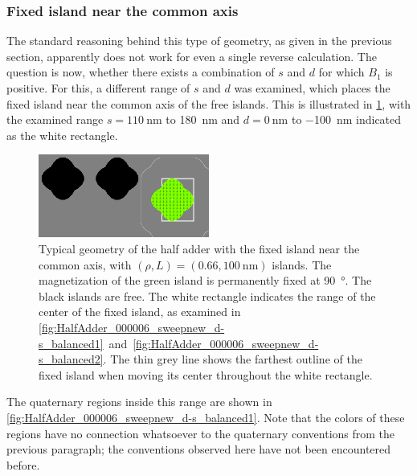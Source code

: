 \documentclass[11pt,a4paper,english,twoside]{article}
\begin{document}
\subsubsection{Fixed island near the common axis}
The standard reasoning behind this type of geometry, as given in the previous section, apparently does not work for even a single reverse calculation. The question is now, whether there exists a combination of $s$ and $d$ for which $B_1$ is positive. For this, a different range of $s$ and $d$ was examined, which places the fixed island near the common axis of the free islands. This is illustrated in \cref{fig:HalfAdder_000006new_geometryTypical}, with the examined range $s=\SI{110}{\nano\metre}$ to \SI{180}{\nano\metre} and $d=\SI{0}{\nano\metre}$ to \SI{-100}{\nano\metre} indicated as the white rectangle. \par
\begin{figure}[hb!]
    \centering
    \includegraphics[width=0.5\textwidth]{Figures/half_adder/regions000014.png}
    \caption{Typical geometry of the half adder with the fixed island near the common axis, with $(\rho, L) = (0.66, \SI{100}{\nano\metre})$ islands. The magnetization of the green island is permanently fixed at \SI{90}{\degree}. The black islands are free. The white rectangle indicates the range of the center of the fixed island, as examined in \cref{fig:HalfAdder_000006_sweepnew_d-s_balanced1}~and~\ref{fig:HalfAdder_000006_sweepnew_d-s_balanced2}. The thin grey line shows the farthest outline of the fixed island when moving its center throughout the white rectangle.}
    \label{fig:HalfAdder_000006new_geometryTypical}
\end{figure}
The quaternary regions inside this range are shown in \cref{fig:HalfAdder_000006_sweepnew_d-s_balanced1}. Note that the colors of these regions have no connection whatsoever to the quaternary conventions from the previous paragraph; the conventions observed here have not been encountered before. \par
\end{document}
